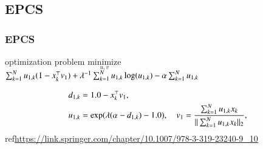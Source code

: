 \documentclass[fleqn,dvipdfmx,10pt]{beamer}
\begin{document}
\subsection{EPCS}
\begin{frame}\frametitle{EPCS}%
  \begin{block}{optimization problem}
    $\underset{u,v}{\text{minimize}}$
    $\sum_{k=1}^Nu_{1,k}(1-x_k^{\top}v_1)+\lambda^{-1}\sum_{k=1}^Nu_{1,k}\log(u_{1,k})-\alpha\sum_{k=1}^Nu_{1,k}$\centering\\
  \end{block}
  \begin{align*}
    d_{1,k}&=1.0-x_k^{\top}v_1,\\
    u_{1,k}&=\exp(\lambda(\alpha-d_{1,k})-1.0),\quad
    v_{1}=\frac{\sum_{k=1}^N u_{1,k} x_{k}}{||\sum_{k=1}^N u_{1,k}x_{k}||_2},\\
  \end{align*}
  ref\url{https://link.springer.com/chapter/10.1007/978-3-319-23240-9_10}
\end{frame}
\end{document}
